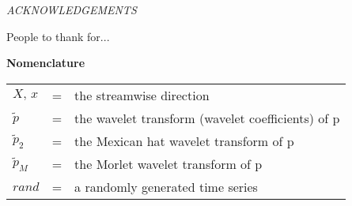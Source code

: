 \documentclass[12pt, oneside]{book}
\newcommand\acknowledgements[1]{
    \thispagestyle{plain}
    \begin{center}{\large{\textit{ACKNOWLEDGEMENTS}} \par}\end{center}
    {\normalsize #1}
}
\begin{document}
\setcounter{page}{3}
\copyrightpage{}
\clearpage %

\acknowledgements{
	People to thank for...
}

\pagestyle{plain}
\tableofcontents
{} %
\listoffigures %
\listoftables %
\clearpage %

\textbf{\huge Nomenclature}\\[1cm]
\renewcommand{\arraystretch}{1.2}
\begin{flushleft}
\begin{longtable}[l]{ l c l } %
\textit{$X,\, x$} 			&=& the streamwise direction \\
\textit{$\widetilde{p}$} 	&=& the wavelet transform (wavelet coefficients) of p \\
\textit{$\widetilde{p}_2$} 	&=& the Mexican hat wavelet transform of p \\
\textit{$\widetilde{p}_M$} 	&=& the Morlet wavelet transform of p \\
\textit{$rand$} 			&=& a randomly generated time series
\end{longtable}
\end{flushleft}
\clearpage %
\end{document}
